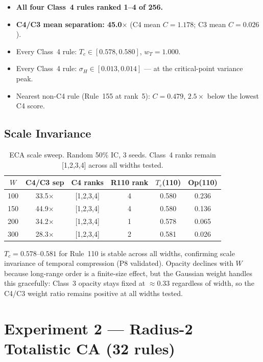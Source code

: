 \documentclass[12pt,a4paper]{article}
\begin{document}
\begin{itemize}[noitemsep]
  \item \textbf{All four Class~4 rules ranked 1--4 of 256.}
  \item \textbf{C4/C3 mean separation: 45.0$\times$}
    (C4 mean $C = 1.178$; C3 mean $C = 0.026$).
  \item Every Class~4 rule: $T_c \in [0.578, 0.580]$, $w_T = 1.000$.
  \item Every Class~4 rule: $\sigma_H \in [0.013, 0.014]$ --- at the
    critical-point variance peak.
  \item Nearest non-C4 rule (Rule~155 at rank~5): $C = 0.479$,
    $2.5\times$ below the lowest C4 score.
\end{itemize}

\subsection{Scale Invariance}

\begin{table}[h]
\centering
\caption{ECA scale sweep. Random 50\% IC, 3 seeds.
Class~4 ranks remain [1,2,3,4] across all widths tested.}
\begin{tabular}{cccccc}
\toprule
$W$ & C4/C3 sep & C4 ranks & R110 rank & $T_c$(110) & Op(110) \\
\midrule
100 & 33.5$\times$ & [1,2,3,4] & 4 & 0.580 & 0.236 \\
150 & 44.9$\times$ & [1,2,3,4] & 4 & 0.580 & 0.136 \\
200 & 34.2$\times$ & [1,2,3,4] & 1 & 0.578 & 0.065 \\
300 & 28.3$\times$ & [1,2,3,4] & 2 & 0.581 & 0.026 \\
\bottomrule
\end{tabular}
\end{table}

$T_c = 0.578$--$0.581$ for Rule~110 is stable across all widths, confirming
scale invariance of temporal compression (P8 validated).
Opacity declines with $W$ because long-range order is a finite-size effect,
but the Gaussian weight handles this gracefully: Class~3 opacity stays fixed
at $\approx 0.33$ regardless of width, so the C4/C3 weight ratio remains
positive at all widths tested.

\section{Experiment 2 --- Radius-2 Totalistic CA (32 rules)}
\end{document}
